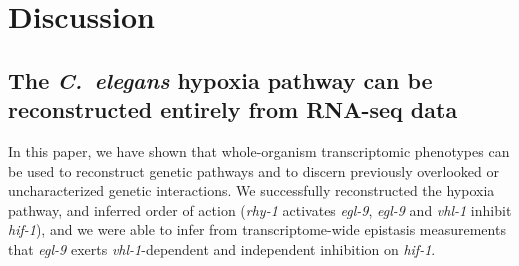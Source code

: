\documentclass[9pt,twocolumn,twoside,lineno]{pnas-new}
\newcommand{\cel}{\emph{C.~elegans}}
\newcommand{\gene}[1]{\emph{#1}}
\newcommand{\egl}{\emph{\mbox{egl-9}(lf)}}
\newcommand{\rhy}{\emph{\mbox{rhy-1}(lf)}}
\newcommand{\vhl}{\emph{\mbox{vhl-1}(lf)}}
\newcommand{\hif}{\emph{\mbox{hif-1(lf)}}}
\newcommand{\hifp}{HIF-1}
\begin{document}
%
%


\section*{Discussion}
\label{sec:discussion}
\subsection*{The \cel{} hypoxia pathway can be reconstructed entirely from
             RNA-seq data}
In this paper, we have shown that whole-organism transcriptomic phenotypes
can be used to reconstruct genetic pathways and to discern previously overlooked
or uncharacterized genetic interactions. We successfully reconstructed the hypoxia
pathway, and inferred order of action (\gene{rhy-1} activates \gene{egl-9},
\gene{egl-9} and \gene{vhl-1} inhibit \gene{hif-1}), and we were able to infer
from transcriptome-wide epistasis measurements that \gene{egl-9} exerts
\gene{vhl-1}-dependent and independent inhibition on \gene{hif-1}.
\end{document}
